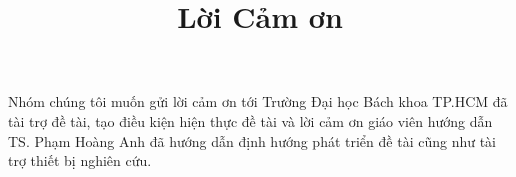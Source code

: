 
\begin{acknowledgements}
\title{Lời Cảm ơn}      


Nhóm chúng tôi muốn gửi lời cảm ơn tới Trường Đại học Bách khoa TP.HCM đã tài trợ đề tài, tạo điều kiện hiện thực đề tài và lời cảm ơn giáo viên hướng dẫn TS. Phạm Hoàng Anh đã hướng dẫn định hướng phát triển đề tài cũng như tài trợ thiết bị nghiên cứu.

\end{acknowledgements}
